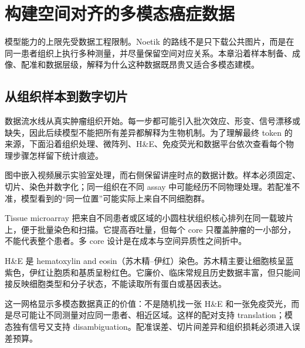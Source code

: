 \section{构建空间对齐的多模态癌症数据}

模型能力的上限先受数据工程限制。Noetik 的路线不是只下载公共图片，而是在同一患者组织上执行多种测量，并尽量保留空间对应关系。本章沿着样本制备、成像、配准和数据层级，解释为什么这种数据既昂贵又适合多模态建模。

\subsection{从组织样本到数字切片}

数据流水线从真实肿瘤组织开始。每一步都可能引入批次效应、形变、信号漂移或缺失，因此后续模型不能把所有差异都解释为生物机制。为了理解最终 token 的来源，下面沿着组织处理、微阵列、H\&E、免疫荧光和数据平台依次查看每个物理步骤怎样留下统计痕迹。


图中嵌入视频展示实验室处理，而右侧保留讲座时点的数据计数。样本必须固定、切片、染色并数字化；同一组织在不同 assay 中可能经历不同物理处理。若配准不准，模型看到的“同一位置”可能实际上来自不同细胞群。


Tissue microarray 把来自不同患者或区域的小圆柱状组织核心排列在同一载玻片上，便于批量染色和扫描。它提高吞吐量，但每个 core 只覆盖肿瘤的一小部分，不能代表整个患者。多 core 设计是在成本与空间异质性之间折中。


H\&E 是 hematoxylin and eosin（苏木精--伊红）染色。苏木精主要让细胞核呈蓝紫色，伊红让胞质和基质呈粉红色。它廉价、临床常规且历史数据丰富，但只能间接反映细胞类型和分子状态，不能读取所有蛋白或基因表达。


这一网格显示多模态数据真正的价值：不是随机找一张 H\&E 和一张免疫荧光，而是尽可能让不同测量对应同一患者、相近区域。这样的配对支持 translation；模态独有信号又支持 disambiguation。配准误差、切片间差异和组织损耗必须进入误差预算。


